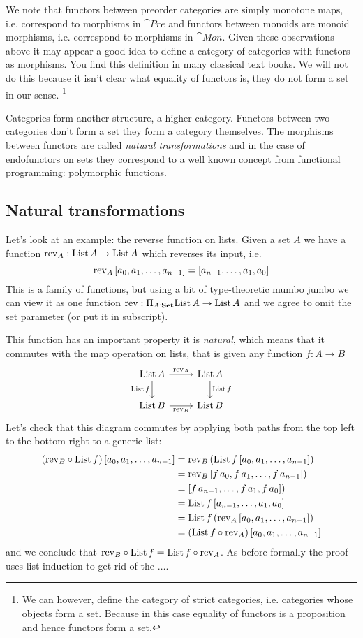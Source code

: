 We note that functors between preorder categories are simply monotone maps, i.e. correspond to morphisms in $\cat{Pre}$ and functors between monoids are monoid morphisms, i.e. correspond to morphisms in $\cat{Mon}$. Given these observations above it may appear a good idea to define a category of categories with functors as morphisms. You find this definition in many classical text books. We will not do this because it isn't clear what equality of functors is, they do not form a set in our sense.
\footnote{We can however, define the category of strict categories, i.e. categories whose objects form a set. Because in this case equality of functors is a proposition and hence functors form a set.}

Categories form another structure, a higher category. Functors between two categories don't form a set they form a category themselves.
The morphisms between functors are called \emph{natural transformations} and in the case of endofunctors on sets they correspond to a well known concept from functional programming: polymorphic functions. 

\subsection{Natural transformations}
\label{sec:natfns}

Let's look at an example: the reverse function on lists. Given a set $A$ we have a function $\mathrm{rev}_A : \mathrm{List}\,A \to \mathrm{List}\,A$ which reverses its input, i.e. 
\[\mathrm{rev}_A\, [a_0,a_1,\dots,a_{n-1}] = [a_{n-1},\dots,a_1,a_0]\]
This is a family of functions, but using a bit of type-theoretic mumbo jumbo we can view it as one function $\mathrm{rev} : \Pi_{A:\mathbf{Set}} \mathrm{List}\,A \to \mathrm{List}\,A$ and we agree to omit the set parameter (or put it in subscript). 

This function has an important property it is \emph{natural}, which means that it commutes with the map operation on lists, that is given any function 
$f : A \to B$
\[\begin{tikzcd}
\List\,A \arrow[r,"\rev_A"] \arrow[d,"\List\,f" left] & \List\,A \arrow[d,"\List\,f"]\\
\List\,B \arrow[r,"\rev_B" below] & \List\,B
\end{tikzcd}
\]
Let's check that this diagram commutes by applying both paths from the top left to the bottom right to a generic list:
\begin{align*}
(\mathrm{rev}_B \circ \mathrm{List}\,f)\, [a_0,a_1,\dots,a_{n-1}] 
& = \mathrm{rev}_B\,(\mathrm{List}\,f\, [a_0,a_1,\dots,a_{n-1}]) \\
& = \mathrm{rev}_B\,[f\,a_0,f\,a_1,\dots,f\,a_{n-1}]) \\
& = [f\,a_{n-1}, \dots,f\,a_1,f\,a_0]) \\
& = \mathrm{List}\,f\, [a_{n-1},\dots,a_1,a_0]\\
& = \mathrm{List}\,f\,(\mathrm{rev}_A\, [a_0,a_1,\dots,a_{n-1}])\\
& = (\mathrm{List}\,f\circ \mathrm{rev}_A)\, [a_0,a_1,\dots,a_{n-1}]
\end{align*}
and we conclude that $\mathrm{rev}_B \circ \mathrm{List}\,f = \mathrm{List}\,f\circ \mathrm{rev}_A$. As before formally the proof uses list induction to get rid of the $\dots$.

